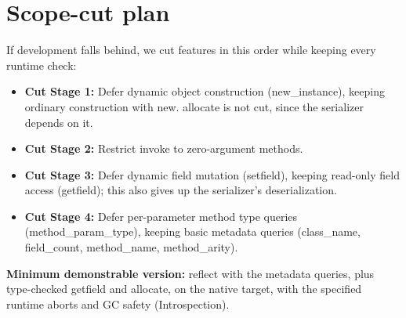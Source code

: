 \section{Scope-cut plan}
If development falls behind, we cut features in this order while keeping
every runtime check:
\begin{itemize}
  \item[--] \textbf{Cut Stage 1:} Defer dynamic object construction
    (new\_instance), keeping ordinary construction with new. allocate is not
    cut, since the serializer depends on it.
  \item[--] \textbf{Cut Stage 2:} Restrict invoke to zero-argument methods.
  \item[--] \textbf{Cut Stage 3:} Defer dynamic field mutation (setfield),
    keeping read-only field access (getfield); this also gives up the
    serializer's deserialization.
  \item[--] \textbf{Cut Stage 4:} Defer per-parameter method type queries
    (method\_param\_type), keeping basic metadata queries (class\_name,
    field\_count, method\_name, method\_arity).
\end{itemize}
\textbf{Minimum demonstrable version:} reflect with the metadata queries, plus
type-checked getfield and allocate, on the native target, with the specified runtime aborts
and GC safety (Introspection).

